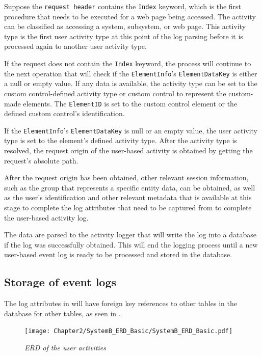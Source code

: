 Suppose the \texttt{request header} contains the \texttt{Index} keyword, which is the first procedure that needs to be executed for a web page being accessed. The activity can be classified as accessing a system, subsystem, or web page. This activity type is the first user activity type at this point of the log parsing before it is processed again to another user activity type. \par If the request does not contain the \texttt{Index} keyword, the process will continue to the next operation that will check if the \texttt{ElementInfo}'s \texttt{ElementDataKey} is either a null or empty value. If any data is available, the activity type can be set to the custom control-defined activity type or custom control to represent the custom-made elements. The \texttt{ElementID} is set to the custom control element or the defined custom control's identification. \par If the \texttt{ElementInfo}'s \texttt{ElementDataKey} is null or an empty value, the user activity type is set to the element's defined activity type. After the activity type is resolved, the request origin of the user-based activity is obtained by getting the request's absolute path.\par After the request origin has been obtained, other relevant session information, such as the group that represents a specific entity data, can be obtained, as well as the user's identification and other relevant metadata that is available at this stage to complete the log attributes that need to be captured from  to complete the user-based activity log.\par The data are parsed to the activity logger that will write the log into a database if the log was successfully obtained. This will end the logging process until a new user-based event log is ready to be processed and stored in the database.

\clearpage

\subsection{Storage of event logs}
The log attributes in  will have foreign key references to other tables in the database for other tables, as seen in . 

\begin{figure}[!htb] %
	\centering %
	\texttt{[image: Chapter2/SystemB\_ERD\_Basic/SystemB\_ERD\_Basic.pdf]}
	\caption[ERD of user activities]
	{\textit{ERD of the user activities}}\label{fig:ch2_erdOfEventLogs}
\end{figure}

